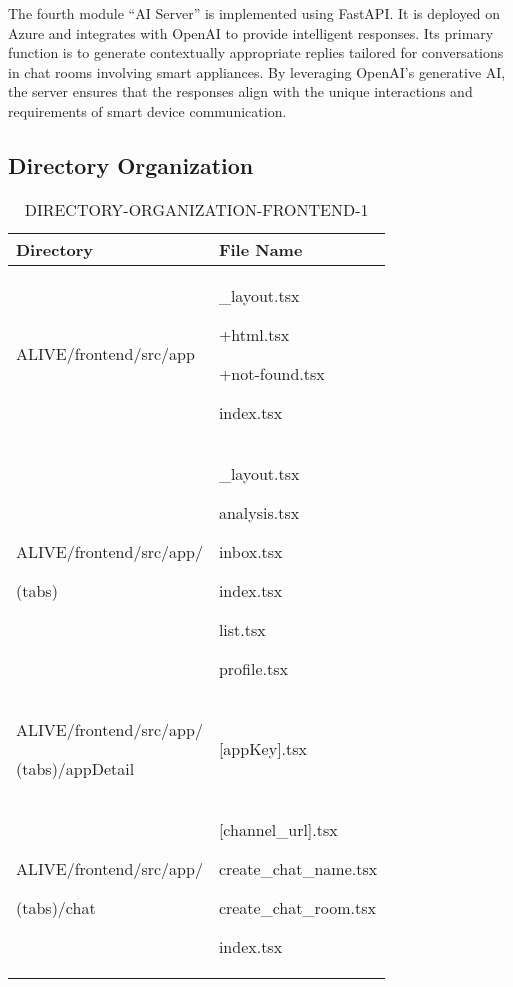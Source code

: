 \documentclass[conference]{IEEEtran}
\begin{document}
\hspace{0.7em} The fourth module “AI Server” is implemented using FastAPI. It is deployed on Azure and integrates with OpenAI to provide intelligent responses. Its primary function is to generate contextually appropriate replies tailored for conversations in chat rooms involving smart appliances. By leveraging OpenAI's generative AI, the server ensures that the responses align with the unique interactions and requirements of smart device communication.

\subsection{Directory Organization}

\begin{table}[h]
\caption{DIRECTORY-ORGANIZATION-FRONTEND-1}
\def\arraystretch{1.24} \small
    \begin{tabular}{|p{3.7cm}|p{4.1cm}|}
\hline
        Directory & File Name \\ \hline
          ALIVE/frontend/src/app  & \_layout.tsx \par +html.tsx \par +not-found.tsx \par index.tsx 
          \\ \hline
          
          ALIVE/frontend/src/app/ \par (tabs) \par  & \_layout.tsx \par analysis.tsx \par inbox.tsx \par index.tsx \par list.tsx \par profile.tsx
          \\ \hline
          
          ALIVE/frontend/src/app/ \par (tabs)/appDetail \par  & [appKey].tsx
          \\ \hline
          
          ALIVE/frontend/src/app/ \par (tabs)/chat \par  & [channel\_url].tsx \par create\_chat\_name.tsx \par create\_chat\_room.tsx \par index.tsx
          \\ \hline
          

\end{tabular}
\end{table}
\end{document}
